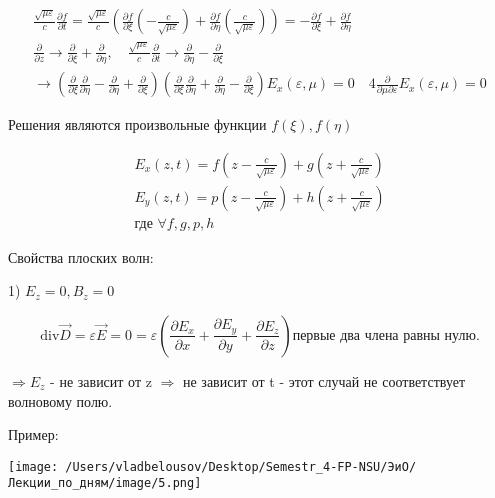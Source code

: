 \documentclass[12pt, a4paper]{report}
\begin{document}
\begin{gather*}
    \frac{\sqrt{\mu \varepsilon}}{c}  \frac{\partial f }{\partial t}      = \frac{\sqrt{\mu \varepsilon}}{c} \left( \frac{\partial f }{\partial \xi } \left( - \frac{c}{\sqrt{\mu \varepsilon}}\right) + \frac{\partial f}{\partial \eta } \left( \frac{c}{\sqrt{\mu \varepsilon}}  \right)  \right)=- \frac{\partial f}{\partial \xi } + \frac{\partial f}{ \partial \eta }  \\ 
    \frac{\partial}{\partial z } \to  \frac{\partial}{\partial \xi } + \frac{\partial}{\partial \eta }, \quad \frac{\sqrt{\mu \varepsilon}}{c}\frac{\partial}{\partial t} \to \frac{\partial}{\partial \eta }- \frac{\partial }{\partial \xi } \\
    \to \left( \frac{\partial}{\partial \xi  } \frac{\partial}{\partial \eta } - \frac{\partial}{\partial \eta } + \frac{\partial}{\partial \xi  }     \right)\left( \frac{\partial}{\partial \xi  } \frac{\partial}{\partial \eta } +\frac{\partial}{\partial \eta } - \frac{\partial}{\partial \xi } \right) E_x ( \varepsilon,\mu)= 0 \quad 4 \frac{\partial}{ \partial\mu \partial\varepsilon}E_x ( \varepsilon,\mu)= 0  
\end{gather*} 

Решения являются произвольные функции \( f(\xi) , f(\eta) \)

\begin{gather*}
    E_x (z,t) = f \left(z- \frac{c}{\sqrt{ \mu \varepsilon }}   \right)+ g \left(  z+ \frac{c}{\sqrt{ \mu \varepsilon }} \right) \\ 
    E_y (z,t) = p \left(z- \frac{c}{\sqrt{ \mu \varepsilon }}   \right)+ h \left(  z+ \frac{c}{\sqrt{ \mu \varepsilon }} \right) \\ 
    \text{где } \forall   f,g,p,h 
\end{gather*}

Свойства плоских волн: 

1) \( E_z = 0 , B_z =0  \) 

\[ \displaystyle  \mathrm{div}\vec{D}=\varepsilon \vec{E} =0 = \varepsilon \left( \frac{\partial E_x }{\partial x }+ \frac{\partial E_y }{\partial y }+\frac{\partial E_z }{\partial z }  \right) \text{первые два члена равны нулю.}    \]


\( \Rightarrow  E_z\) - не зависит от z \( \Rightarrow  \) не зависит от t - этот случай не соответствует волновому полю. 

Пример: 

\begin{center}
    \texttt{[image: /Users/vladbelousov/Desktop/Semestr\_4-FP-NSU/ЭиО/Лекции\_по\_дням/image/5.png]}
\end{center}
\end{document}
